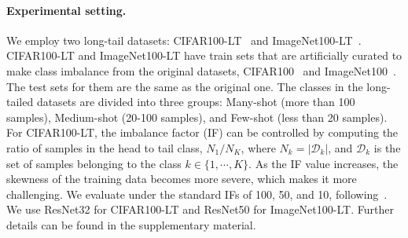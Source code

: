 \begin{table}[t]
\centering
{}
    \caption{\textbf{Ablation study of SYNAuG.} 
    We use CIFAR100-LT.
    Each component, Modifier, Mixup, Re-train, and Finetune, means we use the class-related modifiers in the prompt, use Mixup augmentation during training, and re-train or finetune the last layer after training, respectively.
    (e) stands for our SYNAuG.
    }
    \label{tab:ablation}
\end{table}



\paragraph{Experimental setting.}
We employ two long-tail datasets: CIFAR100-LT~\cite{cao2019learning} and ImageNet100-LT~\cite{jiang2021self}.
CIFAR100-LT and ImageNet100-LT have train sets that are artificially curated to make class imbalance from the original datasets, CIFAR100~\cite{krizhevsky2009learning} and ImageNet100~\cite{tian2020contrastive}.
The test sets for them are the same as the original one.
The classes in the long-tailed datasets are divided into three groups: Many-shot (more than 100 samples), Medium-shot (20-100 samples), and Few-shot (less than 20 samples).
For CIFAR100-LT, the imbalance factor (IF) can be controlled by computing the ratio of samples in the head to tail class, $N_1/N_K$, where $N_k=\left| \mathcal{D}_k\right|$, and $\mathcal{D}_k$ is the set of samples belonging to the class $k\in\{1,\cdots,K\}$.
As the IF value increases, the skewness of the training data becomes more severe, which makes it more challenging.
We evaluate under the standard IFs of 100, 50, and 10, following~\cite{alshammari2022long}.
We use ResNet32 for CIFAR100-LT and ResNet50 for ImageNet100-LT.
Further details can be found in the supplementary material.


